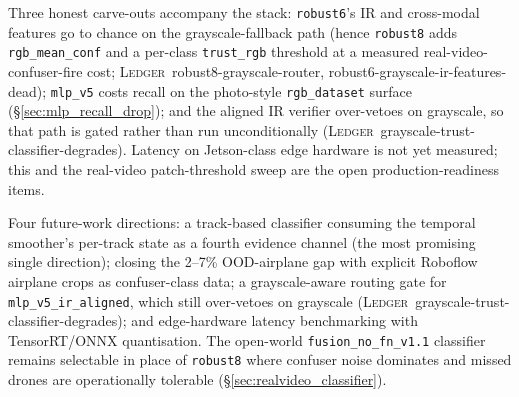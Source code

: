 Three honest carve-outs accompany the stack: \texttt{robust6}'s IR and cross-modal features go to chance on the grayscale-fallback path (hence \texttt{robust8} adds \texttt{rgb\_mean\_conf} and a per-class \texttt{trust\_rgb} threshold at a measured real-video-confuser-fire cost; \textsc{Ledger}~robust8-grayscale-router, robust6-grayscale-ir-features-dead); \texttt{mlp\_v5} costs recall on the photo-style \texttt{rgb\_dataset} surface (\S\ref{sec:mlp_recall_drop}); and the aligned IR verifier over-vetoes on grayscale, so that path is gated rather than run unconditionally (\textsc{Ledger}~grayscale-trust-classifier-degrades). Latency on Jetson-class edge hardware is not yet measured; this and the real-video patch-threshold sweep are the open production-readiness items.

Four future-work directions: a track-based classifier consuming the temporal smoother's per-track state as a fourth evidence channel (the most promising single direction); closing the 2--7\% OOD-airplane gap with explicit Roboflow airplane crops as confuser-class data; a grayscale-aware routing gate for \texttt{mlp\_v5\_ir\_aligned}, which still over-vetoes on grayscale (\textsc{Ledger}~grayscale-trust-classifier-degrades); and edge-hardware latency benchmarking with TensorRT/ONNX quantisation. The open-world \texttt{fusion\_no\_fn\_v1.1} classifier remains selectable in place of \texttt{robust8} where confuser noise dominates and missed drones are operationally tolerable (\S\ref{sec:realvideo_classifier}).

